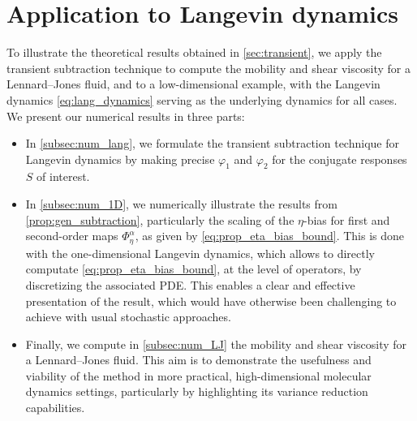 \section{Application to Langevin dynamics}
\label{sec:numerical}
%
%
%
To illustrate the theoretical results obtained in \cref{sec:transient}, we apply the transient subtraction technique to compute the mobility and shear viscosity for a Lennard--Jones fluid, and to a low-dimensional example, with the Langevin dynamics \eqref{eq:lang_dynamics} serving as the underlying dynamics for all cases. We present our numerical results in three parts:
%
\begin{itemize}
	\item In \cref{subsec:num_lang}, we formulate the transient subtraction technique for Langevin dynamics by making precise $\varphi_1$ and $\varphi_2$ for the conjugate responses $S$ of interest.
	 \item In \cref{subsec:num_1D}, we numerically illustrate the results from \cref{prop:gen_subtraction}, particularly the scaling of the $\eta$-bias for first and second-order maps $\Phi_\eta^\alpha$, as given by \eqref{eq:prop_eta_bias_bound}. This is done with the one-dimensional Langevin dynamics, which allows to directly computate \eqref{eq:prop_eta_bias_bound}, at the level of operators, by discretizing the associated PDE. This enables a clear and effective presentation of the result, which would have otherwise been challenging to achieve with usual stochastic approaches. 
	 \item Finally, we compute in \cref{subsec:num_LJ} the mobility and shear viscosity for a Lennard--Jones fluid. This aim is to demonstrate the usefulness and viability of the method in more practical, high-dimensional molecular dynamics settings, particularly by highlighting its variance reduction capabilities.
%
\end{itemize}

